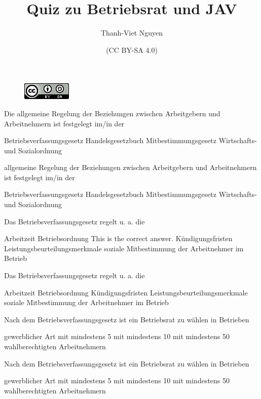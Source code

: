 \documentclass{exam}
\title{Quiz zu Betriebsrat und JAV }
\author{Thanh-Viet Nguyen}
\date{(CC BY-SA 4.0)}
\begin{document}
\maketitle
\begin{figure} [h]
	\centering 
	\includegraphics[width=0.1\linewidth]{img/88x31.png}
\end{figure}
\begin{center}	
	\begin{questions}
		\question Die allgemeine Regelung der Beziehungen zwischen Arbeitgebern und Arbeitnehmern ist festgelegt im/in der
		\begin{checkboxes}
			\choice Betriebsverfassungsgesetz 
			\choice Handelsgesetzbuch 
			\choice Mitbestimmungsgesetz  
			\choice  Wirtschafts- und Sozialordnung
		\end{checkboxes}
		\newpage
		\printanswers
		allgemeine Regelung der Beziehungen zwischen Arbeitgebern und Arbeitnehmern ist festgelegt im/in der
		\begin{checkboxes}
			\CorrectChoice Betriebsverfassungsgesetz 
			\choice Handelsgesetzbuch 
			\choice Mitbestimmungsgesetz  
			\choice Wirtschafts- und Sozialordnung
		\end{checkboxes}
		
		\question  Das Betriebsverfassungsgesetz regelt u. a. die
		\begin{checkboxes}
			\choice Arbeitzeit
			\choice Betriebsordnung 
			\choice This is the correct answer.
			\choice Kündigungsfristen
			\choice Leistungsbeurteilungsmerkmale
			\choice soziale Mitbestimmung der Arbeitnehmer im Betrieb
		\end{checkboxes}
		\newpage
		\printanswers 
		Das Betriebsverfassungsgesetz regelt u. a. die
		\begin{checkboxes}
			\choice Arbeitzeit
			\choice Betriebsordnung 
			\choice Kündigungsfristen
			\choice Leistungsbeurteilungsmerkmale
			\CorrectChoice soziale Mitbestimmung der Arbeitnehmer im Betrieb
		\end{checkboxes}

		\question Nach dem Betriebsverfassungsgesetz ist ein Betriebsrat zu wählen in Betrieben
		\begin{checkboxes}
		\choice gewerblicher Art
		\choice mit mindestens 5
		\choice mit mindestens 10
		\choice mit mindestens 50 wahlberechtigten Arbeitnehmern
		\end{checkboxes}
		\newpage
		\printanswers
		Nach dem Betriebsverfassungsgesetz ist ein Betriebsrat zu wählen in Betrieben
		\begin{checkboxes}
			\choice gewerblicher Art
			\CorrectChoice mit mindestens 5
			\choice mit mindestens 10
			\choice mit mindestens 50 wahlberechtigten Arbeitnehmern
		\end{checkboxes}
		

\end{questions}
\end{center}
\end{document}
